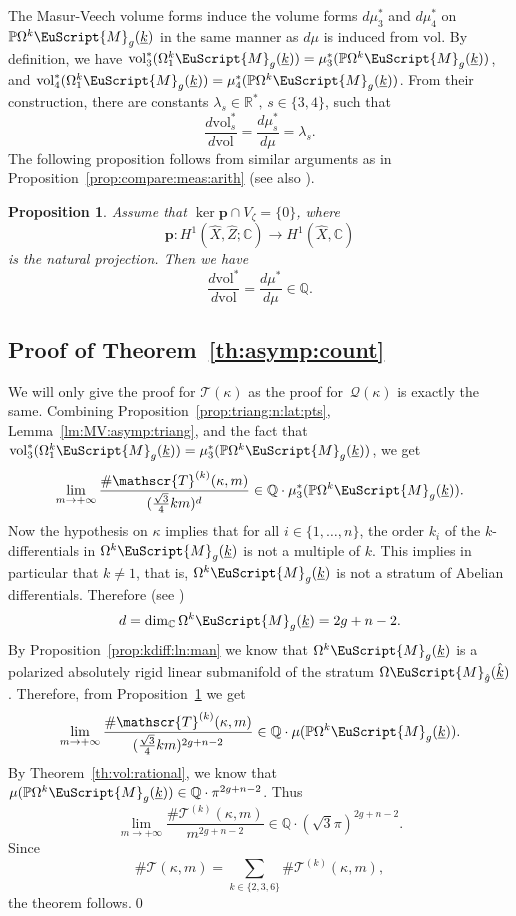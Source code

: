 \documentclass[10pt]{amsart}
\let\mathcal\EuScript
\theoremstyle{plain}
\newtheorem{Proposition}[Theorem]{Proposition}
\theoremstyle{definition}
\newcommand{\R}{\mathbb{R}}
\def\C{\mathbb{C}}
\newcommand{\Q}{\mathbb{Q}}
\newcommand{\Pb}{\mathbb{P}}
\newcommand{\pp}{\boldsymbol{p}}
\newcommand{\Mcal}{\mathcal{M}}
\newcommand{\QQ}{\mathscr{Q}}
\newcommand{\TT}{\mathscr{T}}
\newcommand{\vol}{\mathrm{vol}}
\newcommand{\hX}{\hat{X}}
\newcommand{\hZ}{\hat{Z}}
\let\ul\underline
\newcommand{\Skdiff}{\Omega^k\mathcal{M}_{g}(\ul{k})}
\newcommand{\Skdiffi}{\Omega^k_1\mathcal{M}_{g}(\ul{k})}
\newcommand{\Sabel}{\Omega\Mcal_{\hat{g}}(\ul{\hat{k}})}
\newcommand{\pSkdiff}{\Pb\Omega^k\mathcal{M}_{g}(\ul{k})}
\begin{document}
The Masur-Veech volume forms induce the volume forms $d\mu_3^*$ and $d\mu_4^*$ on $\pSkdiff$ in the same manner as $d\mu$ is induced from $\vol$.
By definition, we have $\vol_3^*(\Skdiffi)=\mu^*_3(\pSkdiff)$, and $\vol_4^*(\Skdiffi)=\mu^*_4(\pSkdiff)$.
From their construction, there are constants $\lambda_s \in \R^*, \, s\in \{3,4\}$, such that
\[
\frac{d\vol_s^*}{d\vol}=\frac{d\mu_s^*}{d\mu}=\lambda_s.
\]
The following proposition follows from similar arguments as in Proposition~\ref{prop:compare:meas:arith} (see also \cite[]{Ngu19}).
\begin{Proposition}\label{prop:ratio:vol:forms}
Assume that $\ker\pp\cap V_\zeta=\{0\}$, where
\[
\pp: H^1(\hX,\hZ;\C) \to H^1(\hX,\C)
\]
is the natural projection. Then we have
\[
\frac{d\vol^*}{d\vol}=\frac{d\mu^*}{d\mu} \in \Q.
\]
\end{Proposition}

\subsection{Proof of Theorem~\ref{th:asymp:count}}
We will only give the proof for $\TT(\kappa)$ as the proof for~$\QQ(\kappa)$ is exactly the same.
Combining Proposition~\ref{prop:triang:n:lat:pts}, Lemma~\ref{lm:MV:asymp:triang}, and the fact that $\vol^*_3(\Skdiffi)=\mu^*_3(\pSkdiff)$, we get
\[
\lim_{m\to +\infty}\frac{\#\TT^{(k)}(\kappa,m)}{(\frac{\sqrt{3}}{4}km)^d} \in \Q\cdot\mu_3^*(\pSkdiff).
\]
Now the hypothesis on $\kappa$ implies that for all $i\in \{1,\dots,n\}$, the order $k_i$ of the $k$\nobreakdash-dif\-ferentials in $\Skdiff$ is not a multiple of $k$. This implies in particular that $k\neq 1$, that is, $\Skdiff$ is not a stratum of Abelian differentials. Therefore (see \cite{BCGGM:kdiff, Ngu19})
\[
d=\dim_\C\Skdiff=2g+n-2.
\]
By Proposition~\ref{prop:kdiff:ln:man} we know that $\Skdiff$ is a polarized absolutely rigid linear submanifold of the stratum $\Sabel$.
Therefore, from Proposition~\ref{prop:ratio:vol:forms} we get
\[
\lim_{m\to +\infty}\frac{\#\TT^{(k)}(\kappa,m)}{(\frac{\sqrt{3}}{4}km)^{2g+n-2}} \in \Q\cdot\mu(\pSkdiff).
\]
By Theorem~\ref{th:vol:rational}, we know that $\mu(\pSkdiff) \in \Q\cdot\pi^{2g+n-2}$. Thus
\[
\lim_{m\to +\infty}\frac{\#\TT^{(k)}(\kappa,m)}{m^{2g+n-2}} \in \Q\cdot(\sqrt{3}\pi)^{2g+n-2}.
\]
Since
\[
\#\TT(\kappa,m)=\sum_{k\in\{2,3,6\}} \#\TT^{(k)}(\kappa,m),
\]
the theorem follows.\qed
\end{document}
